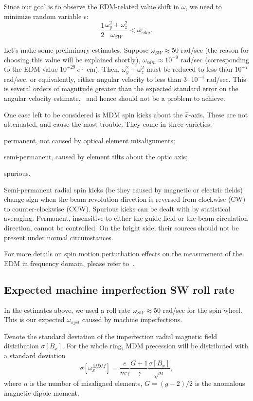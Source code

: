 \documentclass[]{elsarticle}
\newcommand{\w}{\omega}
\newcommand{\wedm}{\w_{edm}}
\newcommand{\wsw}{\w_{SW}}
\begin{document}
Since our goal is to observe the EDM-related value shift in $\w$, we need to minimize random variable
$\epsilon$:
\[
  \frac12\frac{\w_y^2 + \w_z^2}{\wsw} < \wedm.
\]

Let's make some preliminary estimates. Suppose $\wsw\approx 50$ rad/sec (the reason for choosing this
value will be explained shortly), $\wedm\approx10^{-9}$ rad/sec (corresponding to the EDM value
$10^{-29}~e\cdot$ cm). Then, $\w_y^2 + \w_z^2$ must be reduced to less than $10^{-7}$ rad/sec, or equivalently,
either angular velocity to less than $3\cdot 10^{-4}$ rad/sec. This is several orders of magnitude greater than
the expected standard error on the angular velocity estimate,~\cite{Aksentev:Stats} and hence
should not be a problem to achieve.

One case left to be considered is MDM spin kicks about the $\hat x$-axis. These are not attenuated, and cause the
most trouble. They come in three varieties:
\begin{enumerate*}%
\item permanent, not caused by optical element misalignments;
\item semi-permanent, caused by element tilts about the optic axis;
\item spurious.
\end{enumerate*}

Semi-permanent radial spin kicks (be they caused by magnetic or electric fields) change sign when
the beam revolution direction is reversed from clockwise (CW) to counter-clockwise (CCW).
Spurious kicks can be dealt with by statistical averaging.
Permanent, insensitive to either the guide field or the beam circulation direction, cannot be controlled.
On the bright side, their sources should not be present under normal circumstances.

For more details on spin motion perturbation effects on the measurement of the EDM in frequency domain, 
please refer to~\cite{Aksentev:IPAC19:SMP}.

\subsection{Expected machine imperfection SW roll rate}
In the estimates above, we used a roll rate $\wsw\approx 50$ rad/sec for the spin wheel. This is
our expected $\w_{syst}$ caused by machine imperfections.

Denote the standard deviation of the imperfection radial magnetic field distribution $\sigma[B_x]$.
For the whole ring, MDM precession will be distributed with a standard deviation~\cite{Senichev:FDM}
\[
  \sigma[\w_x^{MDM}] = \frac{e}{m\gamma}\frac{G+1}{\gamma}\frac{\sigma[B_x]}{\sqrt{n}},
\]
where $n$ is the number of misaligned elements, $G=(g-2)/2$ is the anomalous magnetic dipole moment.
\end{document}
